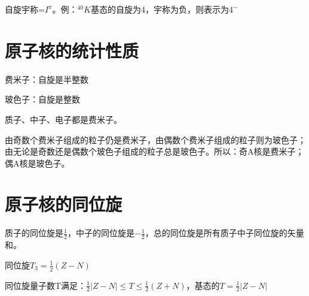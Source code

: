 自旋宇称=$I^{\pi}$。例：$^{40}K$基态的自旋为4，宇称为负，则表示为$4^{-}$

\section{原子核的统计性质}

费米子：自旋是半整数

玻色子：自旋是整数

质子、中子、电子都是费米子。

由奇数个费米子组成的粒子仍是费米子，由偶数个费米子组成的粒子则为玻色子；由无论是奇数还是偶数个玻色子组成的粒子总是玻色子。所以：奇A核是费米子；偶A核是玻色子。

\section{原子核的同位旋}

质子的同位旋是$\frac{1}{2}$，中子的同位旋是$-\frac{1}{2}$，总的同位旋是所有质子中子同位旋的矢量和。

同位旋$T_3 = \frac{1}{2}(Z-N)$

同位旋量子数T满足：$\frac{1}{2}\left\lvert Z - N\right\rvert \leq T \leq \frac{1}{2}(Z + N)$，基态的$T=\frac{1}{2}\left\lvert Z - N\right\rvert$

\clearpage